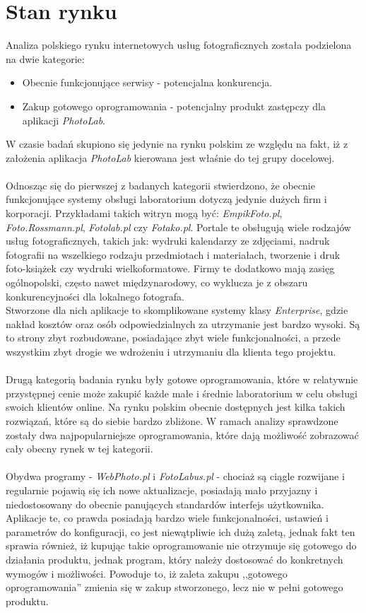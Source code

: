 \section{Stan rynku}
\quad Analiza polskiego rynku internetowych usług fotograficznych została podzielona na dwie kategorie:
\begin{itemize}
    \item Obecnie funkcjonujące serwisy - potencjalna konkurencja.
    \item Zakup gotowego oprogramowania - potencjalny produkt zastępczy dla aplikacji \textit{PhotoLab}. 
\end{itemize}
W czasie badań skupiono się jedynie na rynku polskim ze względu na fakt, iż z założenia aplikacja \textit{PhotoLab} kierowana jest właśnie do tej grupy docelowej. \\
\\
Odnosząc się do pierwszej z badanych kategorii stwierdzono, że obecnie funkcjonujące systemy obsługi laboratorium dotyczą jedynie dużych firm i korporacji. Przykładami takich witryn mogą być: \textit{EmpikFoto.pl}, \textit{Foto.Rossmann.pl}, \textit{Fotolab.pl} czy \textit{Fotako.pl}. Portale te obsługują wiele rodzajów usług fotograficznych, takich jak: wydruki kalendarzy ze zdjęciami, nadruk fotografii na wszelkiego rodzaju przedmiotach i materiałach, tworzenie i druk foto-książek czy wydruki wielkoformatowe. Firmy te dodatkowo mają zasięg ogólnopolski, często nawet międzynarodowy, co wyklucza je z obszaru konkurencyjności dla lokalnego fotografa. 
\\
Stworzone dla nich aplikacje to skomplikowane systemy klasy \textit{Enterprise}, gdzie nakład kosztów oraz osób odpowiedzialnych za utrzymanie jest bardzo wysoki. Są to strony zbyt rozbudowane, posiadające zbyt wiele funkcjonalności, a przede wszystkim zbyt drogie we wdrożeniu i utrzymaniu dla klienta tego projektu.\\
\\
Drugą kategorią badania rynku były gotowe oprogramowania, które w relatywnie przystępnej cenie może zakupić każde małe i średnie laboratorium w celu obsługi swoich klientów online. Na rynku polskim obecnie dostępnych jest kilka takich rozwiązań, które są do siebie bardzo zbliżone. W ramach analizy sprawdzone zostały dwa najpopularniejsze oprogramowania, które dają możliwość zobrazować cały obecny rynek w tej kategorii.\\
\\
Obydwa programy - \textit{WebPhoto.pl} i \textit{FotoLabus.pl} - chociaż są ciągle rozwijane i regularnie pojawią się ich nowe aktualizacje, posiadają mało przyjazny i niedostosowany do obecnie panujących standardów interfejs użytkownika. Aplikacje te, co prawda posiadają bardzo wiele funkcjonalności, ustawień i parametrów do konfiguracji, co jest niewątpliwie ich dużą zaletą, jednak fakt ten sprawia również, iż kupując takie oprogramowanie nie otrzymuje się gotowego do działania produktu, jednak program, który należy dostosować do konkretnych wymogów i możliwości. Powoduje to, iż zaleta zakupu ,,gotowego oprogramowania'' zmienia się w zakup stworzonego, lecz nie w pełni gotowego produktu. \\
